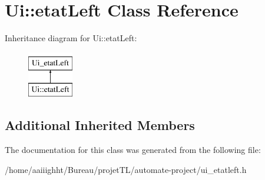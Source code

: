 \hypertarget{class_ui_1_1etat_left}{\section{Ui\-:\-:etat\-Left Class Reference}
\label{class_ui_1_1etat_left}
}
Inheritance diagram for Ui\-:\-:etat\-Left\-:\begin{figure}[H]
\begin{center}
\leavevmode
\includegraphics[height=2.000000cm]{class_ui_1_1etat_left}
\end{center}
\end{figure}
\subsection*{Additional Inherited Members}


The documentation for this class was generated from the following file\-:\begin{DoxyCompactItemize}
\item 
/home/aaiiighht/\-Bureau/projet\-T\-L/automate-\/project/ui\-\_\-etatleft.\-h\end{DoxyCompactItemize}
